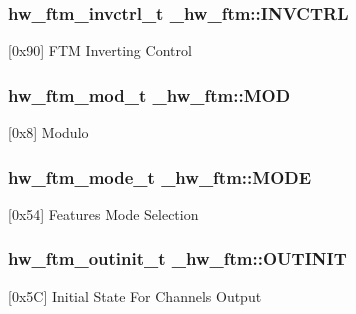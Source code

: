 \subsubsection[{\texorpdfstring{I\+N\+V\+C\+T\+RL}{INVCTRL}}]{ {\bf hw\+\_\+ftm\+\_\+invctrl\+\_\+t} \+\_\+hw\+\_\+ftm\+::\+I\+N\+V\+C\+T\+RL}\hypertarget{struct__hw__ftm_aafa6c18b90cc9fdd8d07b03f7d11a136}{}\label{struct__hw__ftm_aafa6c18b90cc9fdd8d07b03f7d11a136}
\mbox{[}0x90\mbox{]} F\+TM Inverting Control 
\subsubsection[{\texorpdfstring{M\+OD}{MOD}}]{ {\bf hw\+\_\+ftm\+\_\+mod\+\_\+t} \+\_\+hw\+\_\+ftm\+::\+M\+OD}\hypertarget{struct__hw__ftm_a07de5cd4783df103ad8f38d3d535665e}{}\label{struct__hw__ftm_a07de5cd4783df103ad8f38d3d535665e}
\mbox{[}0x8\mbox{]} Modulo 
\subsubsection[{\texorpdfstring{M\+O\+DE}{MODE}}]{ {\bf hw\+\_\+ftm\+\_\+mode\+\_\+t} \+\_\+hw\+\_\+ftm\+::\+M\+O\+DE}\hypertarget{struct__hw__ftm_a09f1a49e4c3465fdb77d210f29dcb516}{}\label{struct__hw__ftm_a09f1a49e4c3465fdb77d210f29dcb516}
\mbox{[}0x54\mbox{]} Features Mode Selection 
\subsubsection[{\texorpdfstring{O\+U\+T\+I\+N\+IT}{OUTINIT}}]{ {\bf hw\+\_\+ftm\+\_\+outinit\+\_\+t} \+\_\+hw\+\_\+ftm\+::\+O\+U\+T\+I\+N\+IT}\hypertarget{struct__hw__ftm_a651be091d199dd5144314c782c7de413}{}\label{struct__hw__ftm_a651be091d199dd5144314c782c7de413}
\mbox{[}0x5C\mbox{]} Initial State For Channels Output 
